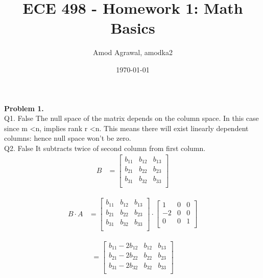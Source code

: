 \documentclass[a4paper]{article}
\title{ECE 498 - Homework 1: Math Basics}
\author{Amod Agrawal, amodka2}
\date{\today}
\begin{document}
\maketitle

\hfill \newline
\textbf{Problem 1.}\\ 
\newline \hfill
Q1. False \newline
The null space of the matrix depends on the column space. In this case since m \textless n, implies rank r \textless n. This means there will exist linearly dependent columns: hence null space won't be zero.\\ 
\newline \hfill
Q2. False \newline
It subtracts twice of second column from first column.\\ 
\newline \hfill
\begin{align}
 B &=  
\begin{bmatrix}
    b_{11} & b_{12} & b_{13} \\
   b_{21} & b_{22} & b_{23} \\
   b_{31} & b_{32} & b_{33} \\
\end{bmatrix}
\end{align}

\begin{align}
B \cdot A &=  
\begin{bmatrix}
   b_{11} & b_{12} & b_{13} \\
   b_{21} & b_{22} & b_{23} \\
   b_{31} & b_{32} & b_{33} \\\end{bmatrix}
\cdot
\begin{bmatrix}
   1 & 0 & 0 \\
   -2 & 0 & 0 \\
   0 & 0 & 1 \\
\end{bmatrix}
\end{align}

\begin{align}
 =  
\begin{bmatrix}
   b_{11} - 2 b_{12} & b_{12} & b_{13} \\
   b_{21} - 2 b_{22} & b_{22} & b_{23} \\
   b_{31} - 2 b_{32} & b_{32} & b_{33} \\
   \end{bmatrix}
\end{align}
\end{document}
